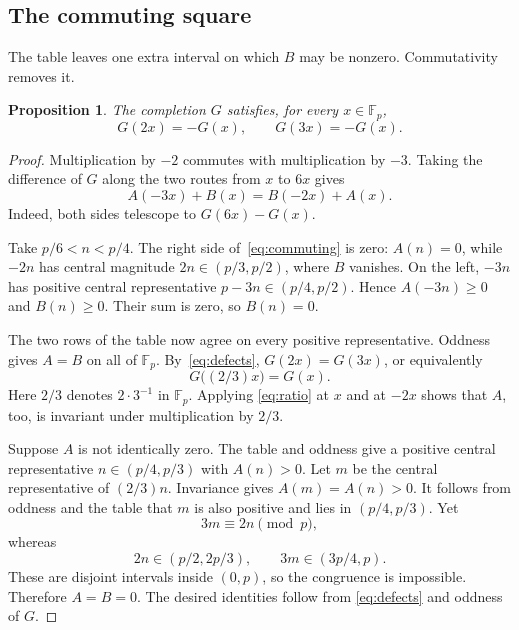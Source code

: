 \documentclass[11pt,a4paper]{article}
\newtheorem{proposition}[theorem]{Proposition}
\theoremstyle{remark}
\numberwithin{equation}{section}
\newcommand{\Fp}{\mathbb F_p}
\begin{document}
\subsection{The commuting square}

The table leaves one extra interval on which \(B\) may be nonzero.
Commutativity removes it.

\begin{proposition}\label{prop:symmetries}
The completion \(G\) satisfies, for every \(x\in\Fp\),
\begin{equation}\label{eq:exact}
  G(2x)=-G(x),\qquad G(3x)=-G(x).
\end{equation}
\end{proposition}

\begin{proof}
Multiplication by \(-2\) commutes with multiplication by \(-3\).
Taking the difference of \(G\) along the two routes from \(x\) to
\(6x\) gives
\begin{equation}\label{eq:commuting}
  A(-3x)+B(x)=B(-2x)+A(x).
\end{equation}
Indeed, both sides telescope to \(G(6x)-G(x)\).

Take \(p/6<n<p/4\). The right side of~\eqref{eq:commuting} is zero:
\(A(n)=0\), while \(-2n\) has central magnitude
\(2n\in(p/3,p/2)\), where \(B\) vanishes. On the left,
\(-3n\) has positive central representative
\(p-3n\in(p/4,p/2)\). Hence \(A(-3n)\ge0\) and \(B(n)\ge0\).
Their sum is zero, so \(B(n)=0\).

The two rows of the table now agree on every positive representative.
Oddness gives \(A=B\) on all of \(\Fp\). By~\eqref{eq:defects},
\(G(2x)=G(3x)\), or equivalently
\begin{equation}\label{eq:ratio}
  G\bigl((2/3)x\bigr)=G(x).
\end{equation}
Here \(2/3\) denotes \(2\cdot3^{-1}\) in \(\Fp\). Applying
\eqref{eq:ratio} at \(x\) and at \(-2x\) shows that \(A\), too,
is invariant under multiplication by \(2/3\).

Suppose \(A\) is not identically zero. The table and oddness give a
positive central representative \(n\in(p/4,p/3)\) with \(A(n)>0\).
Let \(m\) be the central representative of \((2/3)n\). Invariance
gives \(A(m)=A(n)>0\). It follows from oddness and the table that
\(m\) is also positive and lies in \((p/4,p/3)\). Yet
\[
  3m\equiv2n\pmod p,
\]
whereas
\[
  2n\in(p/2,2p/3),\qquad 3m\in(3p/4,p).
\]
These are disjoint intervals inside \((0,p)\), so the congruence is
impossible. Therefore \(A=B=0\). The desired identities follow from
\eqref{eq:defects} and oddness of \(G\).
\end{proof}
\end{document}

